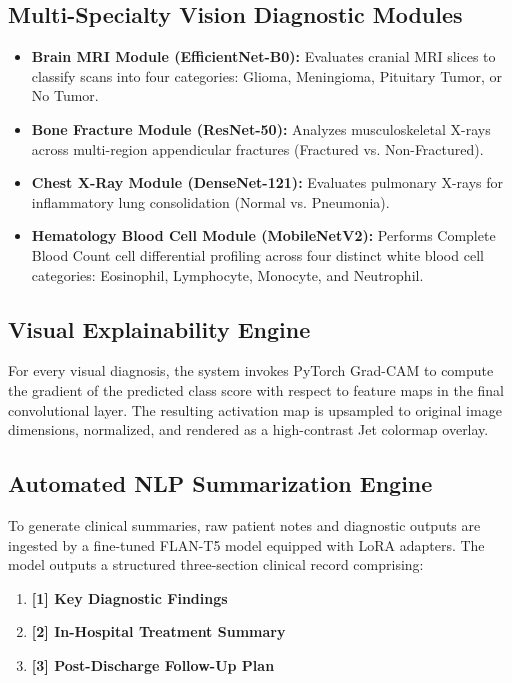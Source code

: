 \documentclass[conference]{IEEEtran}
\begin{document}
\subsection{Multi-Specialty Vision Diagnostic Modules}
\begin{itemize}
    \item \textbf{Brain MRI Module (EfficientNet-B0):} Evaluates cranial MRI slices to classify scans into four categories: Glioma, Meningioma, Pituitary Tumor, or No Tumor.
    \item \textbf{Bone Fracture Module (ResNet-50):} Analyzes musculoskeletal X-rays across multi-region appendicular fractures (Fractured vs. Non-Fractured).
    \item \textbf{Chest X-Ray Module (DenseNet-121):} Evaluates pulmonary X-rays for inflammatory lung consolidation (Normal vs. Pneumonia).
    \item \textbf{Hematology Blood Cell Module (MobileNetV2):} Performs Complete Blood Count cell differential profiling across four distinct white blood cell categories: Eosinophil, Lymphocyte, Monocyte, and Neutrophil.
\end{itemize}

\subsection{Visual Explainability Engine}
For every visual diagnosis, the system invokes PyTorch Grad-CAM to compute the gradient of the predicted class score with respect to feature maps in the final convolutional layer. The resulting activation map is upsampled to original image dimensions, normalized, and rendered as a high-contrast Jet colormap overlay.

\subsection{Automated NLP Summarization Engine}
To generate clinical summaries, raw patient notes and diagnostic outputs are ingested by a fine-tuned FLAN-T5 model equipped with LoRA adapters. The model outputs a structured three-section clinical record comprising:
\begin{enumerate}
    \item \textbf{[1] Key Diagnostic Findings}
    \item \textbf{[2] In-Hospital Treatment Summary}
    \item \textbf{[3] Post-Discharge Follow-Up Plan}
\end{enumerate}
\end{document}
